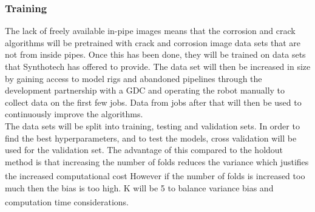 \documentclass[11pt]{article}		%
\newcommand{\supercite}[1]{\textsuperscript{\cite{#1}}}		%
\begin{document}
        \subsubsection{Training}
        
        The lack of freely available in-pipe images means that %
       the corrosion and crack algorithms will be pretrained with crack and corrosion image data sets that are not from inside pipes. %
       Once this has been done, they will be trained on data sets that Synthotech has offered to provide. The data set will then be increased in size by gaining access to model rigs and abandoned pipelines through the development partnership with a GDC and operating the robot manually to collect data on the first few jobs. Data from jobs after that will then be used to continuously improve the algorithms. %
	    \\
        \hspace*{2ex}The data sets will be split into training, testing and validation sets. In order to find the best hyperparameters, and to test the models, cross validation will be used for the validation set. The advantage of this compared to the holdout method is that increasing the number of folds reduces the variance which justifies the increased computational cost\supercite{Cross_Validation} However if the number of folds is increased too much then the bias is too high. K will be 5 to balance variance bias and computation time considerations\supercite{Cross_Validation_Tradeoff}.
        
	       
\end{document}
